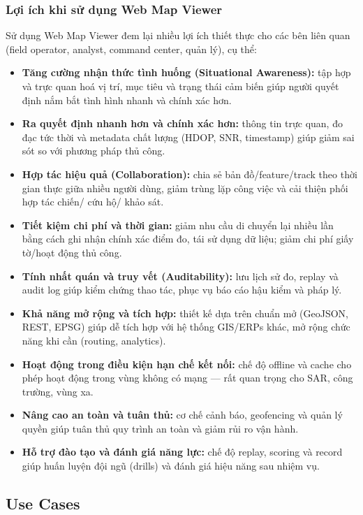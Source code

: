 \begin{itemize}
\subsubsection{Lợi ích khi sử dụng Web Map Viewer}
Sử dụng Web Map Viewer đem lại nhiều lợi ích thiết thực cho các bên liên quan (field operator, analyst, command center, quản lý), cụ thể:
\begin{itemize}
    \item \textbf{Tăng cường nhận thức tình huống (Situational Awareness):} tập hợp và trực quan hoá vị trí, mục tiêu và trạng thái cảm biến giúp người quyết định nắm bắt tình hình nhanh và chính xác hơn.
    \item \textbf{Ra quyết định nhanh hơn và chính xác hơn:} thông tin trực quan, đo đạc tức thời và metadata chất lượng (HDOP, SNR, timestamp) giúp giảm sai sót so với phương pháp thủ công.
    \item \textbf{Hợp tác hiệu quả (Collaboration):} chia sẻ bản đồ/feature/track theo thời gian thực giữa nhiều người dùng, giảm trùng lặp công việc và cải thiện phối hợp tác chiến/ cứu hộ/ khảo sát.
    \item \textbf{Tiết kiệm chi phí và thời gian:} giảm nhu cầu di chuyển lại nhiều lần bằng cách ghi nhận chính xác điểm đo, tái sử dụng dữ liệu; giảm chi phí giấy tờ/hoạt động thủ công.
    \item \textbf{Tính nhất quán và truy vết (Auditability):} lưu lịch sử đo, replay và audit log giúp kiểm chứng thao tác, phục vụ báo cáo hậu kiểm và pháp lý.
    \item \textbf{Khả năng mở rộng và tích hợp:} thiết kế dựa trên chuẩn mở (GeoJSON, REST, EPSG) giúp dễ tích hợp với hệ thống GIS/ERPs khác, mở rộng chức năng khi cần (routing, analytics).
    \item \textbf{Hoạt động trong điều kiện hạn chế kết nối:} chế độ offline và cache cho phép hoạt động trong vùng không có mạng — rất quan trọng cho SAR, công trường, vùng xa.
    \item \textbf{Nâng cao an toàn và tuân thủ:} cơ chế cảnh báo, geofencing và quản lý quyền giúp tuân thủ quy trình an toàn và giảm rủi ro vận hành.
    \item \textbf{Hỗ trợ đào tạo và đánh giá năng lực:} chế độ replay, scoring và record giúp huấn luyện đội ngũ (drills) và đánh giá hiệu năng sau nhiệm vụ.
\end{itemize}
\subsection{Use Cases}

\end{itemize}
